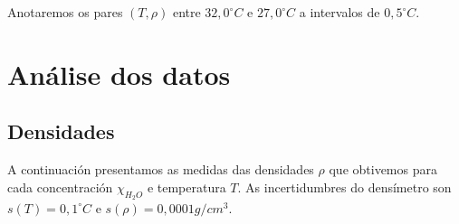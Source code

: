 \documentclass[12pt, a4paper, titlepage]{article}
\begin{document}
  Anotaremos os pares $(T, \rho)$ entre $32,0 ^\circ C$ e $27,0 ^\circ C$ a intervalos de $0,5 ^\circ C$.

  \newpage
  \section{Análise dos datos}

  \subsection{Densidades}
  \label{sec:densidades}

  A continuación presentamos as medidas das densidades $\rho$ que obtivemos para cada concentración $\chi_{H_2O}$ e temperatura $T$. As incertidumbres do densímetro son $s(T) = 0,1 ^\circ C$ e $s(\rho) = 0,0001 g/cm^3$.
\end{document}

